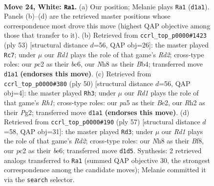 \documentclass[11pt]{article}
\begin{document}
\clearpage

\begin{figure}[p]\centering
\begin{subfigure}{0.46\textwidth}\centering
\resizebox{\linewidth}{!}{%
\newchessgame
\chessboard[
  setfen={r1k3nN/3n4/8/pp2pbpp/8/b4P1P/P1p3PR/3RK3 w - - 0 24},
  showmover=false,
  pgfstyle=straightmove, color=movearrow, markmove={d1-a1}
]}
\caption{}
\end{subfigure}\hfill
\begin{subfigure}{0.46\textwidth}\centering
\resizebox{\linewidth}{!}{%
\newchessgame
\chessboard[
  setfen={7r/3rk1p1/2B2p1p/8/pbP3P1/4B3/PPK2P2/6R1 b - - 5 27},
  showmover=false,
  pgfstyle=straightmove, color=movearrow, markmove={d7-c7}
]}
\caption{}
\end{subfigure}
\\[4pt]
\begin{subfigure}{0.46\textwidth}\centering
\resizebox{\linewidth}{!}{%
\newchessgame
\chessboard[
  setfen={3r1k2/1p3p2/5p1N/p3p3/n6P/Pb2P3/1P2BPP1/4K2R w K - 1 26},
  showmover=false,
  pgfstyle=straightmove, color=movearrow, markmove={h1-h3}
]}
\caption{}
\end{subfigure}\hfill
\begin{subfigure}{0.46\textwidth}\centering
\resizebox{\linewidth}{!}{%
\newchessgame
\chessboard[
  setfen={5b2/1p1r2k1/p3B1p1/P5Bp/4p1n1/1PP5/6PP/R6K b - - 1 29},
  showmover=false,
  pgfstyle=straightmove, color=movearrow, markmove={d7-d3}
]}
\caption{}
\end{subfigure}
\caption{\textbf{Move 24, White: \texttt{Ra1}.} (a) Our position; Melanie plays \texttt{Ra1} (\texttt{d1a1}). Panels (b)--(d) are the retrieved master positions whose correspondence most drove this move (highest QAP objective among those that transfer to it). (b) Retrieved from \texttt{ccrl\_top\_p0000\#1423} (ply 53) [structural distance $d$=56, QAP obj=26]: the master played \texttt{Rc7}; under $\mu$ our \emph{Rd1} plays the role of that game's \emph{Rd2}; cross-type roles: our \emph{p}c2 as their \emph{b}c6, our \emph{N}h8 as their \emph{B}b4; transferred move \texttt{d1a1} \textbf{(endorses this move)}. (c) Retrieved from \texttt{ccrl\_top\_p0000\#380} (ply 50) [structural distance $d$=56, QAP obj=4]: the master played \texttt{Rh3}; under $\mu$ our \emph{Rd1} plays the role of that game's \emph{Rh1}; cross-type roles: our \emph{p}a5 as their \emph{B}e2, our \emph{R}h2 as their \emph{P}g2; transferred move \texttt{d1a1} \textbf{(endorses this move)}. (d) Retrieved from \texttt{ccrl\_top\_p0000\#190} (ply 57) [structural distance $d$=58, QAP obj=31]: the master played \texttt{Rd3}; under $\mu$ our \emph{Rd1} plays the role of that game's \emph{Rd2}; cross-type roles: our \emph{N}h8 as their \emph{B}f8, our \emph{p}c2 as their \emph{b}e6; transferred move \texttt{d1d5}. Synthesis: 2 retrieved analogs transferred to \texttt{Ra1} (summed QAP objective 30, the strongest correspondence among the candidate moves); Melanie committed it via the \texttt{search} selector.}
\label{fig:thought-m46}
\end{figure}
\end{document}
